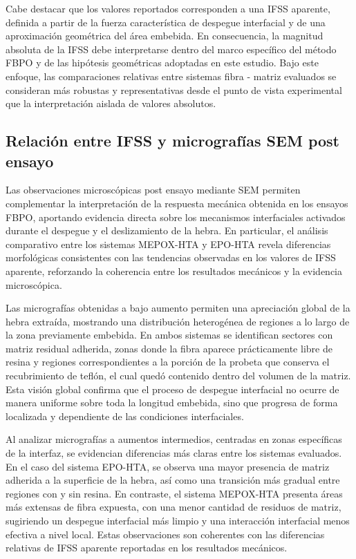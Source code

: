 Cabe destacar que los valores reportados corresponden a una IFSS aparente, definida a partir de
la fuerza característica de despegue interfacial y de una aproximación geométrica del área
embebida. En consecuencia, la magnitud absoluta de la IFSS debe interpretarse dentro del marco
específico del método FBPO y de las hipótesis geométricas adoptadas en este estudio. Bajo este
enfoque, las comparaciones relativas entre sistemas fibra - matriz evaluados se consideran más
robustas y representativas desde el punto de vista experimental que la interpretación aislada
de valores absolutos.

\subsection{Relación entre IFSS y micrografías SEM post ensayo}

Las observaciones microscópicas post ensayo mediante SEM permiten complementar la
interpretación de la respuesta mecánica obtenida en los ensayos FBPO, aportando evidencia
directa sobre los mecanismos interfaciales activados durante el despegue y el deslizamiento de
la hebra. En particular, el análisis comparativo entre los sistemas MEPOX-HTA y EPO-HTA
revela diferencias morfológicas consistentes con las tendencias observadas en los valores de
IFSS aparente, reforzando la coherencia entre los resultados mecánicos y la evidencia
microscópica.

Las micrografías obtenidas a bajo aumento permiten una apreciación global de la hebra extraída,
mostrando una distribución heterogénea de regiones a lo largo de la zona previamente embebida.
En ambos sistemas se identifican sectores con matriz residual adherida, zonas donde la fibra
aparece prácticamente libre de resina y regiones correspondientes a la porción de la probeta que
conserva el recubrimiento de teflón, el cual quedó contenido dentro del volumen de la matriz.
Esta visión global confirma que el proceso de despegue interfacial no ocurre de manera uniforme
sobre toda la longitud embebida, sino que progresa de forma localizada y dependiente de las
condiciones interfaciales.

Al analizar micrografías a aumentos intermedios, centradas en zonas específicas de la interfaz,
se evidencian diferencias más claras entre los sistemas evaluados. En el caso del sistema
EPO-HTA, se observa una mayor presencia de matriz adherida a la superficie de la hebra, así como una
transición más gradual entre regiones con y sin resina. En contraste, el sistema MEPOX-HTA
presenta áreas más extensas de fibra expuesta, con una menor cantidad de residuos de matriz,
sugiriendo un despegue interfacial más limpio y una interacción interfacial menos efectiva a
nivel local. Estas observaciones son coherentes con las diferencias relativas de IFSS aparente
reportadas en los resultados mecánicos.

